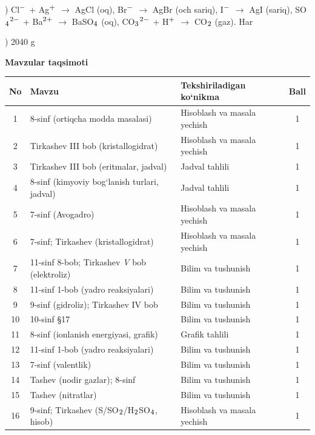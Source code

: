\documentclass[11pt,a4paper]{article}
\renewcommand{\textsubscript}[1]{\ensuremath{_{\text{\fontsize{8}{8}\selectfont #1}}}}
\renewcommand{\textsuperscript}[1]{\ensuremath{^{\text{\fontsize{8}{8}\selectfont #1}}}}
\begin{document}
) Cl\textsuperscript{$-$} + Ag\textsuperscript{+} $\to$ AgCl (oq), Br\textsuperscript{$-$} $\to$ AgBr (och sariq), I\textsuperscript{$-$} $\to$ AgI (sariq), SO\textsubscript{4}\textsuperscript{2$-$} + Ba\textsuperscript{2+} $\to$ BaSO\textsubscript{4} (oq), CO\textsubscript{3}\textsuperscript{2$-$} + H\textsuperscript{+} $\to$ CO\textsubscript{2} (gaz). Har \par
{}) 2040 g\par
\par\bigskip\noindent\textbf{Mavzular taqsimoti}\par\smallskip
{\small\noindent\begin{longtable}{|c|p{7.2cm}|p{5.4cm}|c|}\hline \textbf{No} & \textbf{Mavzu} & \textbf{Tekshiriladigan ko`nikma} & \textbf{Ball}\\\hline
1 & 8-sinf (ortiqcha modda masalasi) & Hisoblash va masala yechish & 1\\\hline
2 & Tirkashev III bob (kristallogidrat) & Hisoblash va masala yechish & 1\\\hline
3 & Tirkashev III bob (eritmalar, jadval) & Jadval tahlili & 1\\\hline
4 & 8-sinf (kimyoviy bog`lanish turlari, jadval) & Jadval tahlili & 1\\\hline
5 & 7-sinf (Avogadro) & Hisoblash va masala yechish & 1\\\hline
6 & 7-sinf; Tirkashev (kristallogidrat) & Hisoblash va masala yechish & 1\\\hline
7 & 11-sinf 8-bob; Tirkashev \textit{V} bob (elektroliz) & Bilim va tushunish & 1\\\hline
8 & 11-sinf 1-bob (yadro reaksiyalari) & Bilim va tushunish & 1\\\hline
9 & 9-sinf (gidroliz); Tirkashev IV bob & Bilim va tushunish & 1\\\hline
10 & 10-sinf \S{}17 & Bilim va tushunish & 1\\\hline
11 & 8-sinf (ionlanish energiyasi, grafik) & Grafik tahlili & 1\\\hline
12 & 11-sinf 1-bob (yadro reaksiyalari) & Bilim va tushunish & 1\\\hline
13 & 7-sinf (valentlik) & Bilim va tushunish & 1\\\hline
14 & Tashev (nodir gazlar); 8-sinf & Bilim va tushunish & 1\\\hline
15 & Tashev (nitratlar) & Bilim va tushunish & 1\\\hline
16 & 9-sinf; Tirkashev (S/SO\textsubscript{2}/H\textsubscript{2}SO\textsubscript{4}, hisob) & Hisoblash va masala yechish & 1\\\hline

\end{longtable}}
\end{document}
